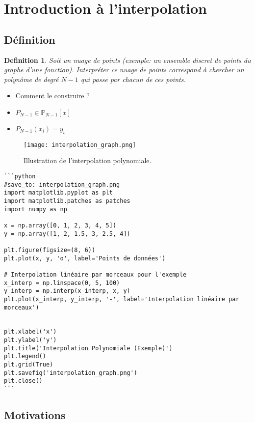 \documentclass{article}
\newtheorem{definition}{Definition}
\begin{document}
\sloppy

\section{Introduction à l'interpolation}

\subsection{Définition}

\begin{definition}
Soit un nuage de points (exemple: un ensemble discret de points du graphe d'une fonction). Interpréter ce nuage de points correspond à chercher un polynôme de degré $N-1$ qui passe par chacun de ces points.
\end{definition}

\begin{itemize}
    \item Comment le construire ?
    \item $P_{N-1} \in \mathbb{P}_{N-1}[x]$
    \item $P_{N-1}(x_i) = y_i$
\end{itemize}

\begin{figure}[h]
    \centering
    \texttt{[image: interpolation\_graph.png]}
    \caption{Illustration de l'interpolation polynomiale.}
    \label{fig:interpolation_graph}
\end{figure}

\begin{verbatim}
```python
#save_to: interpolation_graph.png
import matplotlib.pyplot as plt
import matplotlib.patches as patches
import numpy as np

x = np.array([0, 1, 2, 3, 4, 5])
y = np.array([1, 2, 1.5, 3, 2.5, 4])

plt.figure(figsize=(8, 6))
plt.plot(x, y, 'o', label='Points de données')

# Interpolation linéaire par morceaux pour l'exemple
x_interp = np.linspace(0, 5, 100)
y_interp = np.interp(x_interp, x, y)
plt.plot(x_interp, y_interp, '-', label='Interpolation linéaire par morceaux')


plt.xlabel('x')
plt.ylabel('y')
plt.title('Interpolation Polynomiale (Exemple)')
plt.legend()
plt.grid(True)
plt.savefig('interpolation_graph.png')
plt.close()
```
\end{verbatim}


\subsection{Motivations}
\end{document}
